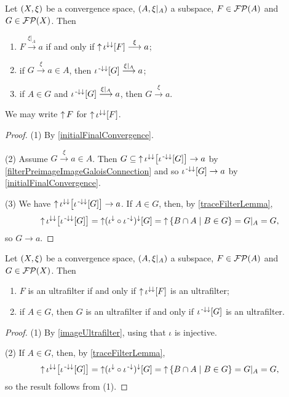 \begin{lemma} \label{subspaceConvergence}
Let $\left( X,\xi \right)$ be a convergence space, $\left( A,\xi|_A \right)$ a subspace, $F\in \operatorname{\mathcal{FP}}(A)$ and $G\in \operatorname{\mathcal{FP}}(X)$. Then
\begin{enumerate}
\item $F \overset{\xi|_A}{\longrightarrow} a$ if and only if $\operatorname{\uparrow} \iota^{\downarrow\downarrow}[F] \overset{\xi}{\longrightarrow} a$;
\item if $G\overset{\xi}{\longrightarrow} a \in A$, then $\iota^{{\text{\hspace{0.15em}-}\downarrow}\downarrow}[G]\overset{\xi|_A}{\longrightarrow} a$;
\item if $A\in G$ and $\iota^{{\text{\hspace{0.15em}-}\downarrow}\downarrow}[G]\overset{\xi|_A}{\longrightarrow} a$, then $G\overset{\xi}{\longrightarrow} a$.
\end{enumerate}
\end{lemma}
We may write $\operatorname{\uparrow} F$ for $\operatorname{\uparrow} \iota^{\downarrow\downarrow}[F]$.
\begin{proof}
(1) By \ref{initialFinalConvergence}.

(2) Assume $G\overset{\xi}{\longrightarrow} a \in A$. Then $G \subseteq \operatorname{\uparrow}\iota^{\downarrow\downarrow}\big[\iota^{{\text{\hspace{0.15em}-}\downarrow}\downarrow}[G]\big] \to a$ by \ref{filterPreimageImageGaloisConnection} and so $\iota^{{\text{\hspace{0.15em}-}\downarrow}\downarrow}[G] \to a$ by \ref{initialFinalConvergence}.

(3) We have $\operatorname{\uparrow}\iota^{\downarrow\downarrow}\big[\iota^{{\text{\hspace{0.15em}-}\downarrow}\downarrow}[G]\big] \to a$. If $A\in G$, then, by \ref{traceFilterLemma},
\[ \operatorname{\uparrow}\iota^{\downarrow\downarrow}\big[\iota^{{\text{\hspace{0.15em}-}\downarrow}\downarrow}[G]\big] = \operatorname{\uparrow}( \iota^{\downarrow}\circ \iota^{{\text{\hspace{0.15em}-}\downarrow}})^\downarrow[G] = \operatorname{\uparrow} \left\{ B\cap A \;\middle|\; B\in G \right\} = G|_A = G, \]
so $G\to a$.
\end{proof}

\begin{lemma} \label{subspaceUltrafilters}
Let $\left( X,\xi \right)$ be a convergence space, $\left( A,\xi|_A \right)$ a subspace, $F\in \operatorname{\mathcal{FP}}(A)$ and $G\in \operatorname{\mathcal{FP}}(X)$. Then
\begin{enumerate}
\item $F$ is an ultrafilter \textup{if and only if} $\operatorname{\uparrow} \iota^{\downarrow\downarrow}[F]$ is an ultrafilter;
\item if $A\in G$, then $G$ is an ultrafilter \textup{if and only if} $\iota^{{\text{\hspace{0.15em}-}\downarrow}\downarrow}[G]$ is an ultrafilter.
\end{enumerate}
\end{lemma}
\begin{proof}
(1) By \ref{imageUltrafilter}, using that $\iota$ is injective.

(2) If $A\in G$, then, by \ref{traceFilterLemma},
\[ \operatorname{\uparrow}\iota^{\downarrow\downarrow}\big[\iota^{{\text{\hspace{0.15em}-}\downarrow}\downarrow}[G]\big] = \operatorname{\uparrow}( \iota^{\downarrow}\circ \iota^{{\text{\hspace{0.15em}-}\downarrow}})^\downarrow[G] = \operatorname{\uparrow} \left\{ B\cap A \;\middle|\; B\in G \right\} = G|_A = G, \]
so the result follows from (1).
\end{proof}


